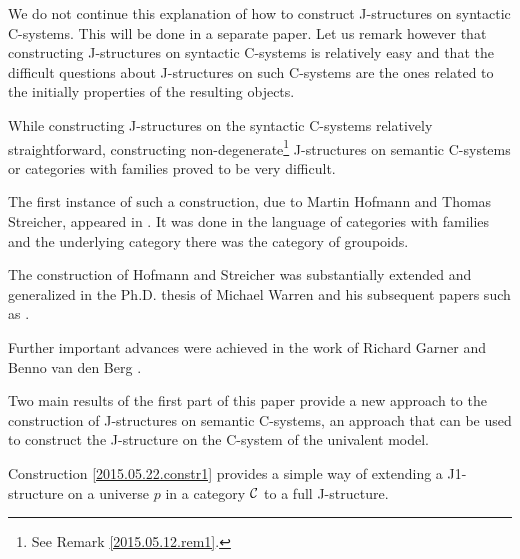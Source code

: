 \documentclass[12pt]{article}
\numberwithin{equation}{section}
\newcommand{\comment}[1]{}
\begin{document}
We do not continue this explanation of how to construct J-structures on
syntactic C-systems. This will be done in a separate paper. Let us remark
however that constructing J-structures on syntactic C-systems is relatively
easy and that the difficult questions about J-structures on such C-systems are
the ones related to the initially properties of the resulting objects.

While constructing J-structures on the syntactic C-systems relatively
straightforward, constructing non-degenerate\footnote{See Remark
  \ref{2015.05.12.rem1}.} J-structures on semantic C-systems or categories with
families proved to be very difficult.

The first instance of such a construction, due to Martin Hofmann and Thomas
Streicher, appeared in \cite{Hofmann1}. It was done in the language of
categories with families and the underlying category there was the category of
groupoids.

The construction of Hofmann and Streicher was substantially extended and
generalized in the Ph.D.{} thesis of Michael Warren
\cite{WarrenThesisProsp,WarrenThesis} and his subsequent papers such as
\cite{Warreninfty}.

Further important advances were achieved in the work of Richard Garner and
Benno van den Berg \cite{BergandGarner}.

\comment{However the original expectation that it should be possible to
  construct C-systems or categories with families with J-structures
  corresponding to all Quillen closed model categories with sufficiently good
  properties have not been realized. In particular none of the previous methods
  provided a construction of a C-system whose underlying category is the
  category of simplicial sets and whose J-structure corresponds, in an
  appropriately defined sense, to the standard closed model structure on this
  category.

This goal is still not fully realized in this paper since to achieve it one has
to construct a Kan fibration with certain properties and discussing such a
construction is outside of the scope of this paper. }

Two main results of the first part of this paper provide a new approach to the
construction of J-structures on semantic C-systems, an approach that can be
used to construct the J-structure on the C-system of the univalent model.

Construction \ref{2015.05.22.constr1} provides a simple way of extending a
J1-structure on a universe $p$ in a category $\cal C$ to a full J-structure.
\end{document}
